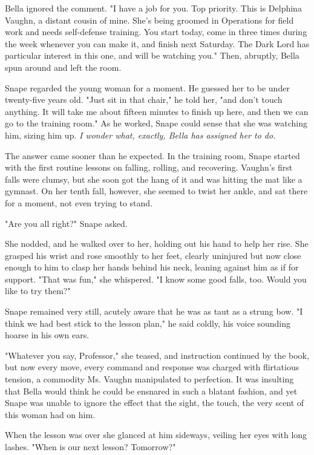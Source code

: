 Bella ignored the comment. "I have a job for you. Top priority. This is Delphina Vaughn, a distant cousin of mine. She's being groomed in Operations for field work and needs self-defense training. You start today, come in three times during the week whenever you can make it, and finish next Saturday. The Dark Lord has particular interest in this one, and will be watching you." Then, abruptly, Bella spun around and left the room.

Snape regarded the young woman for a moment. He guessed her to be under twenty-five years old. "Just sit in that chair," he told her, "and don't touch anything. It will take me about fifteen minutes to finish up here, and then we can go to the training room." As he worked, Snape could sense that she was watching him, sizing him up. \emph{I wonder what, exactly, Bella has assigned her to do.}

The answer came sooner than he expected. In the training room, Snape started with the first routine lessons on falling, rolling, and recovering. Vaughn's first falls were clumsy, but she soon got the hang of it and was hitting the mat like a gymnast. On her tenth fall, however, she seemed to twist her ankle, and sat there for a moment, not even trying to stand.

"Are you all right?" Snape asked.

She nodded, and he walked over to her, holding out his hand to help her rise. She grasped his wrist and rose smoothly to her feet, clearly uninjured but now close enough to him to clasp her hands behind his neck, leaning against him as if for support. "That was fun," she whispered. "I know some good falls, too. Would you like to try them?"

Snape remained very still, acutely aware that he was as taut as a strung bow. "I think we had best stick to the lesson plan," he said coldly, his voice sounding hoarse in his own ears.

"Whatever you say, Professor," she teased, and instruction continued by the book, but now every move, every command and response was charged with flirtatious tension, a commodity Ms. Vaughn manipulated to perfection. It was insulting that Bella would think he could be ensnared in such a blatant fashion, and yet Snape was unable to ignore the effect that the sight, the touch, the very scent of this woman had on him.

When the lesson was over she glanced at him sideways, veiling her eyes with long lashes. "When is our next lesson? Tomorrow?"

